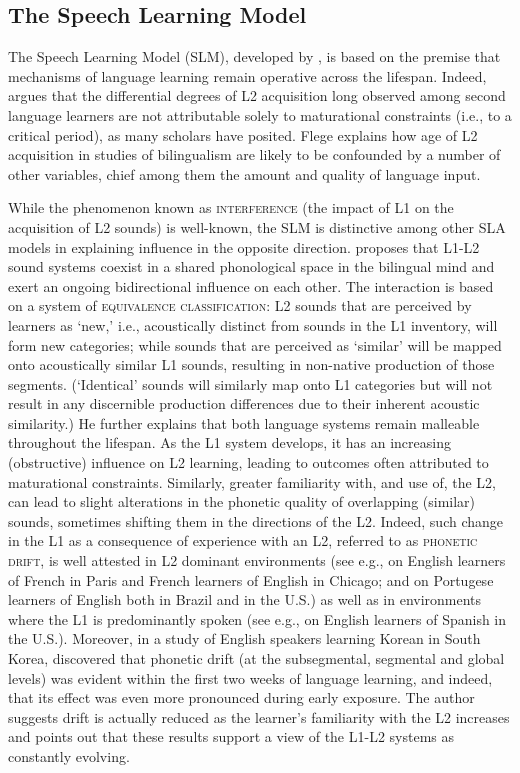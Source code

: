\documentclass[output=paper]{langsci/langscibook}
\begin{document}
 
\subsection{The Speech Learning Model}
\label{sec:nove:3.2}


The Speech Learning Model (SLM), developed by \citet{Flege1995, Flege1996}, is based on the premise that mechanisms of language learning remain operative across the lifespan. Indeed, \citet{Flege2007} argues that the differential degrees of L2 acquisition long observed among second language learners are not attributable solely to maturational constraints (i.e., to a critical period), as many scholars have posited. Flege explains how age of L2 acquisition in studies of bilingualism are likely to be confounded by a number of other variables, chief among them the amount and quality of language input. 

While the phenomenon known as \textsc{interference} (the impact of L1 on the acquisition of L2 sounds) is well-known, the SLM is distinctive among other SLA models in explaining influence in the opposite direction. \citet{Flege1995, Flege1996} proposes that L1-L2 sound systems coexist in a shared phonological space in the bilingual mind and exert an ongoing bidirectional influence on each other. The interaction is based on a system of \textsc{equivalence} \textsc{classification}: L2 sounds that are perceived by learners as ‘new,’ i.e., acoustically distinct from sounds in the L1 inventory, will form new categories; while sounds that are perceived as ‘similar’ will be mapped onto acoustically similar L1 sounds, resulting in non-native production of those segments. (‘Identical’ sounds will similarly map onto L1 categories but will not result in any discernible production differences due to their inherent acoustic similarity.) He further explains that both language systems remain malleable throughout the lifespan. As the L1 system develops, it has an increasing (obstructive) influence on L2 learning, leading to outcomes often attributed to maturational constraints. Similarly, greater familiarity with, and use of, the L2, can lead to slight alterations in the phonetic quality of overlapping (similar) sounds, sometimes shifting them in the directions of the L2. Indeed, such change in the L1 as a consequence of experience with an L2, referred to as \textsc{phonetic} \textsc{drift,} is well attested in L2 dominant environments (see e.g., \citealt{Flege1987} on English learners of French in Paris and French learners of English in Chicago; and \citealt{SancierFowler1997} on Portugese learners of English both in Brazil and in the U.S.) as well as in environments where the L1 is predominantly spoken (see e.g., \citet{HerdEtAl2015} on English learners of Spanish in the U.S.). Moreover, in a study of English speakers learning Korean in South Korea, \citet{Chang2012, Chang2013} discovered that phonetic drift (at the subsegmental, segmental and global levels) was evident within the first two weeks of language learning, and indeed, that its effect was even more pronounced during early exposure. The author suggests drift is actually reduced as the learner’s familiarity with the L2 increases and points out that these results support a view of the L1-L2 systems as constantly evolving.  
\end{document}
